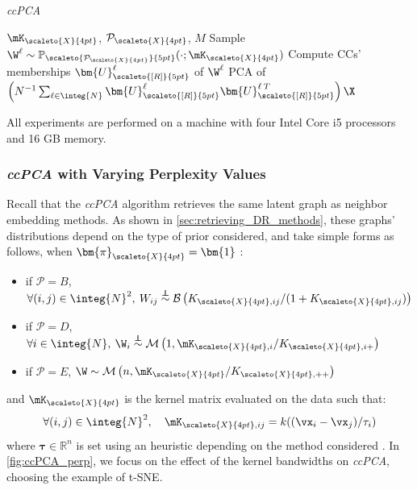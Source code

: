\vspace{0.5cm}

\begin{algorithm}[H]
  \caption{\textit{ccPCA}}
  \label{alg:3CPCA}
\begin{algorithmic}
   $\mK_{\scaleto{X}{4pt}}$, $\mathcal{P}_{\scaleto{X}{4pt}}$, $M$
  \STATE Sample $\W^{\ell} \sim  \mathbb{P}_{\scaleto{\mathcal{P}_{\scaleto{X}{4pt}}}{5pt}}(\cdot ; \mK_{\scaleto{X}{4pt}})$
  \STATE Compute CCs' memberships $\bm{U}^{\ell}_{\scaleto{[R]}{5pt}}$ of $\W^{\ell}$
  \ENDFOR
   PCA of $\left(N^{-1}\sum_{\ell \in \integ{N}} \bm{U}^{\ell}_{\scaleto{[R]}{5pt}} \bm{U}_{\scaleto{[R]}{5pt}}^{\ell\:T} \right) \X$
\end{algorithmic}
\label{algo:ccPCA}
\end{algorithm}

All experiments are performed on a
machine with four Intel Core i5 processors and 16 GB memory.

\subsubsection{\textit{ccPCA} with Varying Perplexity Values}\label{sec:other_perp}

Recall that the \textit{ccPCA} algorithm retrieves the same latent graph as neighbor embedding methods. As shown in \cref{sec:retrieving_DR_methods}, these graphs' distributions depend on the type of prior considered, and take simple forms as follows, when $\bm{\pi}_{\scaleto{X}{4pt}} = \bm{1}$ :
\begin{itemize}
    \item if $\mathcal{P} = B$, $\forall (i,j) \in \integ{N}^2, \: W_{ij} \stackrel{\perp\!\!\!\!\perp}{\sim} \mathcal{B}\left(K_{\scaleto{X}{4pt},ij}/(1 + K_{\scaleto{X}{4pt},ij}) \right)$
    \item if $\mathcal{P} = D$, $\forall i \in \integ{N}, \: \W_{i} \stackrel{\perp\!\!\!\!\perp}{\sim} \mathcal{M}\left(1, \mK_{\scaleto{X}{4pt},i}/K_{\scaleto{X}{4pt},i+} \right)$
    \item if $\mathcal{P} = E$, $\W \sim \mathcal{M}\left(n, \mK_{\scaleto{X}{4pt}}/ K_{\scaleto{X}{4pt},++} \right)$
\end{itemize}
and $\mK_{\scaleto{X}{4pt}}$ is the kernel matrix evaluated on the data such that:
$$\forall (i,j) \in \integ{N}^2, \quad \mK_{\scaleto{X}{4pt},ij} = k((\vx_i - \vx_j)/\tau_{i})$$
where $\bm{\tau} \in \mathbb{R}^n$ is set using an heuristic depending on the method considered \citep{maaten2008tSNE, mcinnes2018umap, tang2016visualizing}. In \cref{fig:ccPCA_perp}, we focus on the effect of the kernel bandwidths on \textit{ccPCA}, choosing the example of t-SNE.

